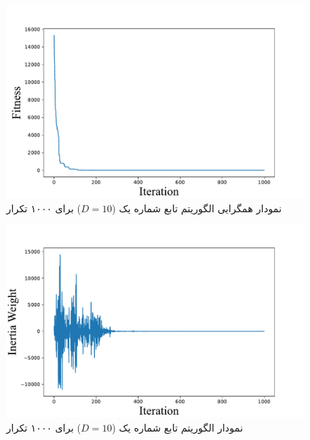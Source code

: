 
 \begin{figure}[H]
	\caption{نمودار همگرایی الگوریتم  تابع شماره یک ($D=10$) برای ۱۰۰۰ تکرار } 
	\centering 
	\includegraphics[width=16cm]{../Figure/Q1/PSO_convergence_curve} 
\end{figure}

 \begin{figure}[H]
	\caption{نمودار  الگوریتم  تابع شماره یک ($D=10$) برای ۱۰۰۰ تکرار } 
	\centering 
	\includegraphics[width=16cm]{../Figure/Q1/PSO_inertia_weight} 
\end{figure}

